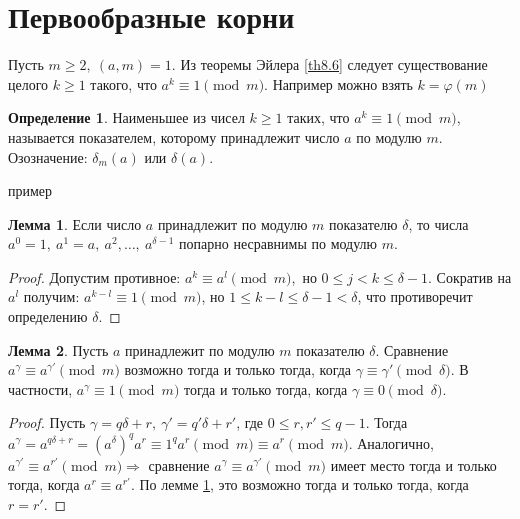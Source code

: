 \documentclass[a4paper, 12pt]{article}
\renewcommand{\phi}{\varphi}
\theoremstyle{definition}
\newtheorem{definition}{Определение}[section]
\newtheorem{lemma}{Лемма}[section]
\newtheorem*{example}{Пример}
\begin{document}
    \section{Первообразные корни}
    Пусть $m\geq 2,\ (a,m)=1$. Из теоремы Эйлера \eqref{th8.6} следует существование целого $k\geq 1$ такого, что $a^k\equiv 1\pmod{m}$. Например можно взять $k=\phi(m)$
    \begin{definition}
        Наименьшее из чисел $k\geq 1$ таких, что $a^k\equiv 1\pmod{m}$, называется показателем, которому принадлежит число $a$ по модулю $m$. Озозначение: $\delta_m(a)$ или $\delta(a)$.
    \end{definition} 
    пример
    \begin{lemma}\label{lemma11.1}
        Если число $a$ принадлежит по модулю $m$ показателю $\delta$, то числа $a^0=1,\ a^1=a,\ a^2,\dots,\ a^{\delta-1}$ попарно несравнимы по модулю $m$.
    \end{lemma} 
    \begin{proof}
        Допустим противное: $a^k\equiv a^l \pmod{m}$,\ но $0\leq j<k\leq \delta-1$. Сократив на $a^l$ получим: $a^{k-l}\equiv 1\pmod{m}$, но $1\leq k-l\leq \delta-1<\delta$, что противоречит определению $\delta$.
    \end{proof} 
    \begin{lemma}\label{lemma11.2}
        Пусть $a$ принадлежит по модулю $m$ показателю $\delta$. Сравнение $a^{\gamma}\equiv a^{\gamma'}\pmod{m}$ возможно тогда и только тогда, когда $\gamma\equiv \gamma'\pmod{\delta}$. В частности, $a^{\gamma}\equiv 1\pmod{m}$ тогда и только тогда, когда $\gamma\equiv 0\pmod{\delta}$.
    \end{lemma} 
    \begin{proof}
        Пусть $\gamma=q\delta+r,\ \gamma'=q'\delta+r'$, где $0\leq r,r'\leq q-1$. Тогда $a^{\gamma}=a^{q\delta+r}=(a^{\delta})^q a^r\equiv 1^qa^r\pmod{m}\equiv a^r\pmod{m}$. Аналогично, \\
        $a^{\gamma'} \equiv a^{r'}\pmod{m} \Rightarrow$ сравнение $a^{\gamma}\equiv a^{\gamma'}\pmod{m}$ имеет место тогда и только тогда, когда $a^r\equiv a^{r'}$. По лемме \ref{lemma11.1}, это возможно тогда и только тогда, когда\\
        $r=r'$.
    \end{proof} 
\end{document}
